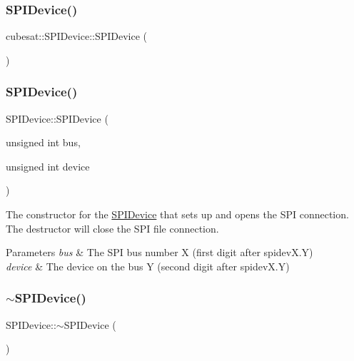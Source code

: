 \subsubsection{\texorpdfstring{S\+P\+I\+Device()}{SPIDevice()}\hspace{0.1cm}{\footnotesize\ttfamily [1/2]}}
{\footnotesize\ttfamily cubesat\+::\+S\+P\+I\+Device\+::\+S\+P\+I\+Device (\begin{DoxyParamCaption}{ }\end{DoxyParamCaption})\hspace{0.3cm}{\ttfamily [inline]}}

\mbox{\label{classcubesat_1_1SPIDevice_a5079ac1013f2e25e3eb873ba06ed41b1}} 
\subsubsection{\texorpdfstring{S\+P\+I\+Device()}{SPIDevice()}\hspace{0.1cm}{\footnotesize\ttfamily [2/2]}}
{\footnotesize\ttfamily S\+P\+I\+Device\+::\+S\+P\+I\+Device (\begin{DoxyParamCaption}\item[{unsigned int}]{bus,  }\item[{unsigned int}]{device }\end{DoxyParamCaption})}

The constructor for the \hyperlink{classcubesat_1_1SPIDevice}{S\+P\+I\+Device} that sets up and opens the S\+PI connection. The destructor will close the S\+PI file connection. 
\begin{DoxyParams}{Parameters}
{\em bus} & The S\+PI bus number X (first digit after spidev\+X.\+Y) \\
\hline
{\em device} & The device on the bus Y (second digit after spidev\+X.\+Y) \\
\hline
\end{DoxyParams}
\mbox{\label{classcubesat_1_1SPIDevice_a4026a0ad0b2f3a70b663a7f29b7e29a4}} 
\subsubsection{\texorpdfstring{$\sim$\+S\+P\+I\+Device()}{~SPIDevice()}}
{\footnotesize\ttfamily S\+P\+I\+Device\+::$\sim$\+S\+P\+I\+Device (\begin{DoxyParamCaption}{ }\end{DoxyParamCaption})\hspace{0.3cm}{\ttfamily [virtual]}}

